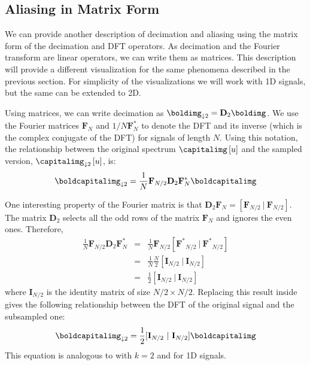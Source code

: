 \subsection{Aliasing in Matrix Form}


We can provide another description of decimation and aliasing using the matrix form of the decimation and DFT operators. As decimation and the Fourier transform are linear operators, we can write them as matrices.
This description will provide a different visualization for the same phenomena described in the previous section. For simplicity of the visualizations we will work with 1D signals, but the same can be extended to 2D.

Using matrices, we can write decimation as $\boldimg_{\downarrow 2} = \mathbf{D}_2 \boldimg$. We use the Fourier matrices $\mathbf {F}_{N}$ and $1/N \mathbf {F}^{*}_{N}$ to denote the DFT and its inverse  (which is the complex conjugate of the DFT) for signals of length $N$. Using this notation, the relationship between the original spectrum $\capitalimg \left[u\right]$ and the sampled version, $\capitalimg_{\downarrow 2} \left[u\right]$, is:
\begin{equation}
	\boldcapitalimg_{\downarrow 2} = \frac{1}{N} \mathbf{F}_{N/2} \mathbf{D}_2 \mathbf{F}^{*}_{N} \boldcapitalimg
	\label{eq:matrixformsubsampling}
\end{equation}

One interesting property of the Fourier matrix is that $\mathbf{D}_2 \mathbf{F}_{N} = [\mathbf{F}_{N/2} ~|~ \mathbf{F}_{N/2}]$. The matrix $\mathbf{D}_2$ selects all the odd rows of the matrix $\mathbf{F}_{N}$ and ignores the even ones. Therefore,
\begin{eqnarray}
	\frac{1}{N} \mathbf{F}_{N/2} \mathbf{D}_2 \mathbf{F}^{*}_{N} &=& \frac{1}{N}\mathbf{F}_{N/2}  [\mathbf{F^*}_{N/2} ~|~ \mathbf{F^*}_{N/2}] \\
	&=& \frac{1}{N} \frac{N}{2} [\mathbf{I}_{N/2} ~|~ \mathbf{I}_{N/2}] \\
	&=& \frac{1}{2} [\mathbf{I}_{N/2} ~|~ \mathbf{I}_{N/2}]
\end{eqnarray}
where $\mathbf{I}_{N/2}$ is the identity matrix of size $N/2 \times N/2$. Replacing this result inside \eqn{\ref{eq:matrixformsubsampling}} gives the following relationship between the DFT of the original signal and the subsampled one:
\begin{equation}
	\boldcapitalimg_{\downarrow 2} = \frac{1}{2} [\mathbf{I}_{N/2} ~|~ \mathbf{I}_{N/2}] \boldcapitalimg
\end{equation}
This equation is analogous to \eqn{\ref{eq:decimationFT}} with $k=2$ and for 1D signals.

